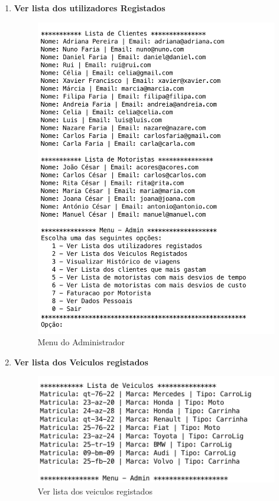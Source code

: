 \begin{enumerate}
	\item \textbf{Ver lista dos utilizadores Registados}
	\begin{figure}[htpb]
		\centering
		\includegraphics[scale=0.5]{imagem/verListaAtores}
		\caption{Menu do Administrador }
		\label{p3:fig:p3_verListaAtores}
	\end{figure}

\item \textbf{Ver lista dos Veiculos registados }
	\begin{figure}[htpb]
	\centering
	\includegraphics[scale=0.5]{imagem/verListaVeiculos}
	\caption{Ver lista dos veiculos registados }
	\label{p3:fig:p3_verListaVeiculos}
\end{figure}


\end{enumerate}
